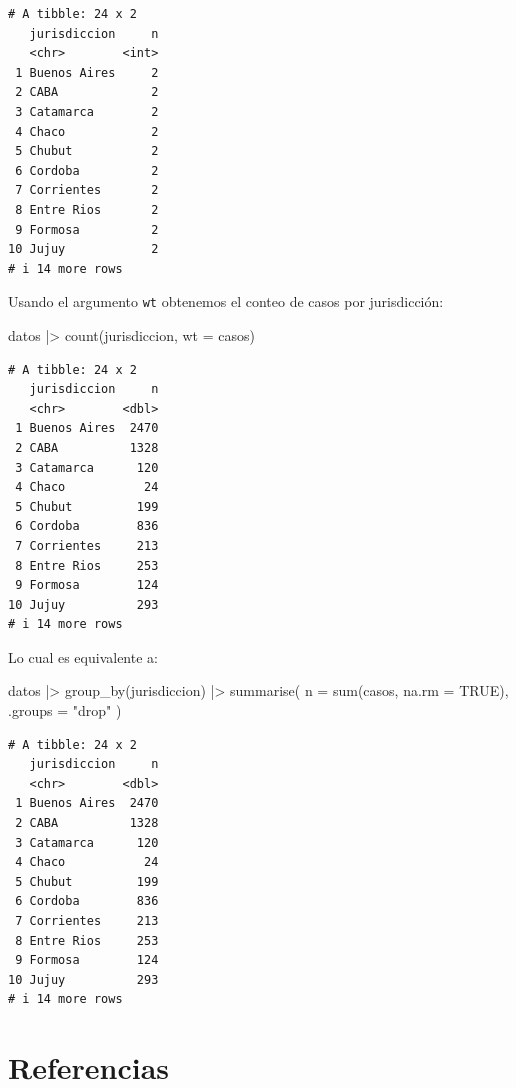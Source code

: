 \documentclass[
  spanish,
  a4paper,
]{scrbook}
\newenvironment{Shaded}{\begin{snugshade}}{\end{snugshade}}
\newcommand{\AttributeTok}[1]{\textcolor[rgb]{0.40,0.45,0.13}{#1}}
\newcommand{\ConstantTok}[1]{\textcolor[rgb]{0.56,0.35,0.01}{#1}}
\newcommand{\FunctionTok}[1]{\textcolor[rgb]{0.28,0.35,0.67}{#1}}
\newcommand{\NormalTok}[1]{\textcolor[rgb]{0.00,0.23,0.31}{#1}}
\newcommand{\SpecialCharTok}[1]{\textcolor[rgb]{0.37,0.37,0.37}{#1}}
\newcommand{\StringTok}[1]{\textcolor[rgb]{0.13,0.47,0.30}{#1}}
\begin{document}
\begin{verbatim}
# A tibble: 24 x 2
   jurisdiccion     n
   <chr>        <int>
 1 Buenos Aires     2
 2 CABA             2
 3 Catamarca        2
 4 Chaco            2
 5 Chubut           2
 6 Cordoba          2
 7 Corrientes       2
 8 Entre Rios       2
 9 Formosa          2
10 Jujuy            2
# i 14 more rows
\end{verbatim}

Usando el argumento \texttt{wt} obtenemos el conteo de casos por
jurisdicción:

\begin{Shaded}
\begin{Highlighting}[]
\NormalTok{datos }\SpecialCharTok{|\textgreater{}}
  \FunctionTok{count}\NormalTok{(jurisdiccion, }\AttributeTok{wt =}\NormalTok{ casos)}
\end{Highlighting}
\end{Shaded}

\begin{verbatim}
# A tibble: 24 x 2
   jurisdiccion     n
   <chr>        <dbl>
 1 Buenos Aires  2470
 2 CABA          1328
 3 Catamarca      120
 4 Chaco           24
 5 Chubut         199
 6 Cordoba        836
 7 Corrientes     213
 8 Entre Rios     253
 9 Formosa        124
10 Jujuy          293
# i 14 more rows
\end{verbatim}

Lo cual es equivalente a:

\begin{Shaded}
\begin{Highlighting}[]
\NormalTok{datos }\SpecialCharTok{|\textgreater{}}
  \FunctionTok{group\_by}\NormalTok{(jurisdiccion) }\SpecialCharTok{|\textgreater{}}
  \FunctionTok{summarise}\NormalTok{(}
    \AttributeTok{n =} \FunctionTok{sum}\NormalTok{(casos, }\AttributeTok{na.rm =} \ConstantTok{TRUE}\NormalTok{),}
    \AttributeTok{.groups =} \StringTok{"drop"}
\NormalTok{  )}
\end{Highlighting}
\end{Shaded}

\begin{verbatim}
# A tibble: 24 x 2
   jurisdiccion     n
   <chr>        <dbl>
 1 Buenos Aires  2470
 2 CABA          1328
 3 Catamarca      120
 4 Chaco           24
 5 Chubut         199
 6 Cordoba        836
 7 Corrientes     213
 8 Entre Rios     253
 9 Formosa        124
10 Jujuy          293
# i 14 more rows
\end{verbatim}

\section*{Referencias}\label{referencias-1}
\end{document}
